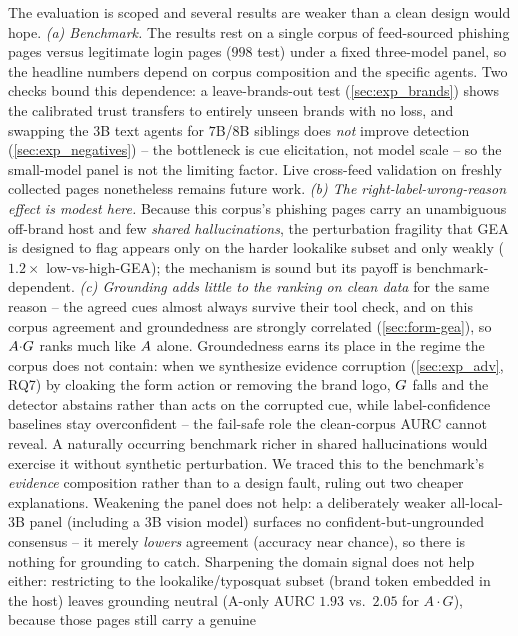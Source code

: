 \label{sec:limitations}
The evaluation is scoped and several results are weaker than a clean design would hope.
\emph{(a) Benchmark.} The results rest on a single corpus of feed-sourced phishing pages
versus legitimate login pages ($998$ test) under a fixed three-model panel, so the
headline numbers depend on corpus composition and the specific agents. Two checks bound this
dependence: a leave-brands-out test (\autoref{sec:exp_brands}) shows the calibrated trust
transfers to entirely unseen brands with no loss, and swapping the $3$B text agents for $7$B/$8$B
siblings does \emph{not} improve detection (\autoref{sec:exp_negatives}) -- the bottleneck is
cue elicitation, not model scale -- so the small-model panel is not the limiting factor.
Live cross-feed validation on freshly collected pages nonetheless remains future work. \emph{(b)
The right-label-wrong-reason effect is modest here.} Because this corpus's phishing pages
carry an unambiguous off-brand host and few \emph{shared hallucinations}, the perturbation
fragility that GEA is designed to flag appears only on the harder lookalike subset and
only weakly ($1.2\times$ low-vs-high-GEA); the mechanism is sound but its payoff is
benchmark-dependent. \emph{(c) Grounding adds little to the ranking on \emph{clean} data} for the
same reason -- the agreed cues almost always survive their tool check, and on this corpus
agreement and groundedness are strongly correlated (\autoref{sec:form-gea}), so
$A{\cdot}G$ ranks much like $A$ alone. Groundedness earns its place in the regime the corpus does
not contain: when we synthesize evidence corruption (\autoref{sec:exp_adv}, RQ7) by
cloaking the form action or removing the brand logo, $G$ falls and the detector
abstains rather than acts on the corrupted cue, while label-confidence baselines stay
overconfident -- the fail-safe role the clean-corpus AURC cannot reveal. A naturally
occurring benchmark richer in shared hallucinations would exercise it without synthetic
perturbation. We traced this to the benchmark's
\emph{evidence} composition rather than to a design fault, ruling out two cheaper
explanations. Weakening the panel does not help: a deliberately weaker all-local-3B
panel (including a 3B vision model) surfaces no confident-but-ungrounded consensus -- it
merely \emph{lowers} agreement (accuracy near chance), so there is nothing for grounding to
catch. Sharpening the domain signal does not help either: restricting to the
lookalike/typosquat subset (brand token embedded in the host) leaves grounding neutral
(A-only AURC $1.93$ vs.\ $2.05$ for $A{\cdot}G$), because those pages still carry a genuine
